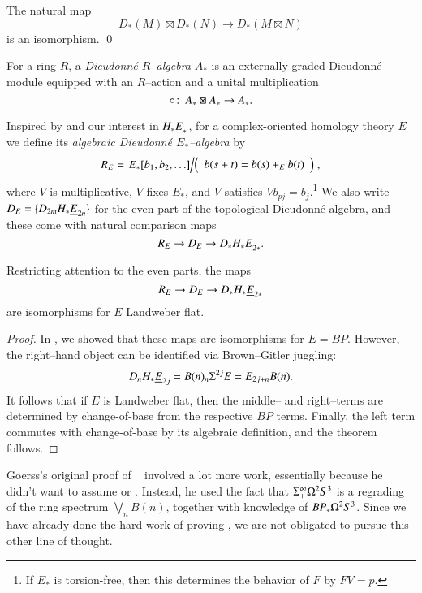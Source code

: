 \begin{lemma}
The natural map \[D_*(M) \boxtimes D_*(N) \to D_*(M \boxtimes N)\] is an isomorphism. \qed
\end{lemma}

\begin{definition}
For a ring $R$, a \textit{Dieudonn\'e $R$--algebra} $A_*$ is an externally graded Dieudonn\'e module equipped with an $R$--action and a unital multiplication \[\circ\colon\thinspace A_* \boxtimes A_* \to A_*.\]
\end{definition}

\begin{example}
Inspired by  and our interest in $H_* \underline{\smash{E}}_{*}$, for a complex-oriented homology theory $E$ we define its \textit{algebraic Dieudonn\'e $E_*$--algebra} by \[R_E = \left. E_*[b_1, b_2, \ldots] \middle/ \left( \begin{array}{c} b(s+t) = b(s) +_E b(t) \end{array} \right) \right.,\] where $V$ is multiplicative, $V$ fixes $E_*$, and $V$ satisfies $Vb_{pj} = b_j$.\footnote{If $E_*$ is torsion-free, then this determines the behavior of $F$ by $FV = p$.}  We also write $D_E = \{D_{2m} H_* \underline{\smash{E}}_{2n}\}$ for the even part of the topological Dieudonn\'e algebra, and these come with natural comparison maps \[R_E \to D_E \to D_* H_* \underline{\smash{E}}_{2*}.\]
\end{example}

\begin{theorem}\label{LandweberFlatUnstableCoopns}
Restricting attention to the even parts, the maps \[R_E \to D_E \to D_* H_* \underline{\smash{E}}_{2*}\] are isomorphisms for $E$ Landweber flat.
\end{theorem}
\begin{proof}
In , we showed that these maps are isomorphisms for $E = BP$.  However, the right--hand object can be identified via Brown--Gitler juggling: \[D_n H_* \underline{\smash{E}}_{2j} = B(n)_n \Sigma^{2j} E = E_{2j+n} B(n).\]  It follows that if $E$ is Landweber flat, then the middle-- and right--terms are determined by change-of-base from the respective $BP$ terms.  Finally, the left term commutes with change-of-base by its algebraic definition, and the theorem follows.
\end{proof}

\begin{remark}
Goerss's original proof of ~\cite{GoerssDieudonne} involved a lot more work, essentially because he didn't want to assume  or .  Instead, he used the fact that $\Sigma^\infty_+ \Omega^2 S^3$ is a regrading of the ring spectrum $\bigvee_n B(n)$, together with knowledge of $BP_* \Omega^2 S^3$.  Since we have already done the hard work of proving , we are not obligated to pursue this other line of thought.
\end{remark}

